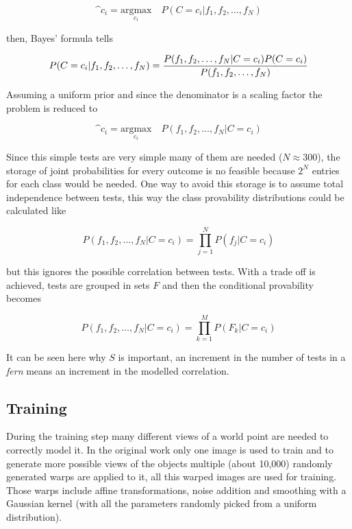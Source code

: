 \begin{equation}
  \^c_i = \underset{c_i}{\text{argmax}} \quad P(C = c_i | f_1, f_2, \ldots, f_N)
\end{equation}

then, Bayes' formula tells

\begin{equation}
  P(C = c_i | f_1, f_2, \ldots, f_N) = \frac{P(f_1,f_2,\ldots,f_N \arrowvert C=c_i) P(C=c_i)}{P(f_1,f_2,\ldots,f_N)}
\end{equation}

Assuming a uniform prior and since the denominator is a scaling factor the problem is reduced to

\begin{equation}
  \^c_i = \underset{c_i}{\text{argmax}} \quad P(f_1, f_2, \ldots, f_N | C = c_i)
\end{equation}

Since this simple tests are very simple many of them are needed ($N \approx 300$), the storage of joint probabilities for every outcome is no feasible because $2^N$ entries for each class would be needed. One way to avoid this storage is to assume total independence between tests, this way the class provability distributions could be calculated like

\begin{equation}
  P(f_1, f_2, \ldots, f_N | C = c_i) = \prod^{N}_{j=1}P(f_j | C = c_i)
\end{equation}

but this ignores the possible correlation between tests. With  a trade off is achieved, tests are grouped in sets $F$ and then the conditional provability becomes

\begin{equation}
  P(f_1, f_2, \ldots, f_N | C = c_i) = \prod^{M}_{k=1} P(F_k | C = c_i)
\end{equation}

It can be seen here why $S$ is important, an increment in the number of tests in a \textit{fern} means an increment in the modelled correlation.\\

\subsection{Training}
\label{sub:training}

During the training step many different views of a world point are needed to correctly model it. In the original work \cite{Ozuysal2010} only one image is used to train and to generate more possible views of the objects multiple (about 10,000) randomly generated warps are applied to it, all this warped images are used for training. Those warps include affine transformations, noise addition and smoothing with a Gaussian kernel (with all the parameters randomly picked from a uniform distribution).\\

